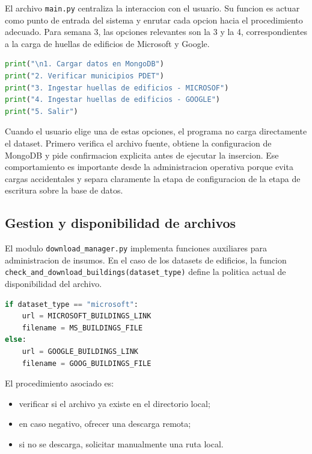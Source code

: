 \documentclass[12pt]{article}
\begin{document}
El archivo \texttt{main.py} centraliza la interaccion con el usuario. Su funcion es actuar como punto de entrada del sistema y enrutar cada opcion hacia el procedimiento adecuado. Para semana 3, las opciones relevantes son la 3 y la 4, correspondientes a la carga de huellas de edificios de Microsoft y Google.

\begin{lstlisting}[style=basicstyle,language=Python]
print("\n1. Cargar datos en MongoDB")
print("2. Verificar municipios PDET")
print("3. Ingestar huellas de edificios - MICROSOF")
print("4. Ingestar huellas de edificios - GOOGLE")
print("5. Salir")
\end{lstlisting}

Cuando el usuario elige una de estas opciones, el programa no carga directamente el dataset. Primero verifica el archivo fuente, obtiene la configuracion de MongoDB y pide confirmacion explicita antes de ejecutar la insercion. Ese comportamiento es importante desde la administracion operativa porque evita cargas accidentales y separa claramente la etapa de configuracion de la etapa de escritura sobre la base de datos.

\subsection{Gestion y disponibilidad de archivos}

El modulo \texttt{download\_manager.py} implementa funciones auxiliares para administracion de insumos. En el caso de los datasets de edificios, la funcion \texttt{check\_and\_download\_buildings(dataset\_type)} define la politica actual de disponibilidad del archivo.

\begin{lstlisting}[style=basicstyle,language=Python]
if dataset_type == "microsoft":
    url = MICROSOFT_BUILDINGS_LINK
    filename = MS_BUILDINGS_FILE
else:
    url = GOOGLE_BUILDINGS_LINK
    filename = GOOG_BUILDINGS_FILE
\end{lstlisting}

El procedimiento asociado es:

\begin{itemize}[leftmargin=*]
    \item verificar si el archivo ya existe en el directorio local;
    \item en caso negativo, ofrecer una descarga remota;
    \item si no se descarga, solicitar manualmente una ruta local.
\end{itemize}
\end{document}
